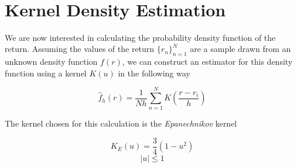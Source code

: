 \documentclass[11pt]{article}
\begin{document}
    \begin{center}
    \end{center}
    { \hspace*{\fill} \\}
    
    \hypertarget{kernel-density-estimation}{%
\section{Kernel Density Estimation}\label{kernel-density-estimation}}

We are now interested in calculating the probability density function of
the return. Assuming the values of the return \(\{r_n\}_{n=1}^N\) are a
sample drawn from an unknown density function \(f(r)\), we can construct
an estimator for this density function using a kernel \(K(u)\) in the
following way

\[\hat{f}_h (r) = \frac{1}{Nh} \sum_{n=1}^{N} K\left(\frac{r - r_i}{h}\right)\]

The kernel chosen for this calculation is the \emph{Epanechnikov} kernel

\[K_E(u) = \frac{3}{4}(1 - u^2)\] \[|u| \leq 1\]
\end{document}
